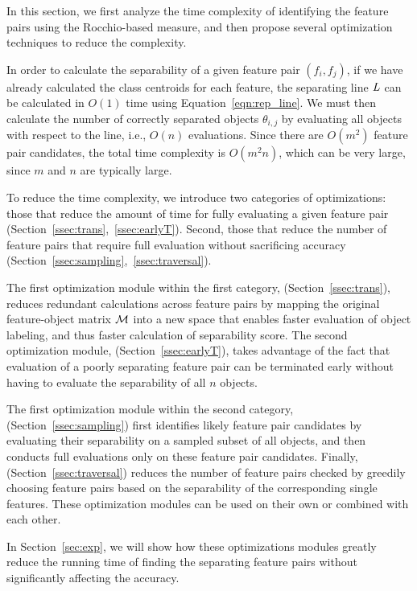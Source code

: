 In this section, we first analyze the time complexity of identifying the \topk feature pairs using the Rocchio-based measure, and then propose several optimization techniques to reduce the complexity.

 In order to calculate the separability of a given feature pair $(f_i, f_j)$, if we have already calculated the class centroids for each feature, the separating line $\mathit{L}$ can be calculated in $O(1)$ time using Equation~\ref{eqn:rep_line}. We must then calculate the number of correctly separated objects $\theta_{i,j}$ by evaluating all objects with respect to the line, i.e., $O(n)$ evaluations. Since there are $O(m^2)$ feature pair candidates, the total time complexity is $O(m^2n)$, which can be very large,
since $m$ and $n$ are typically large.

 To reduce the time complexity, we introduce two categories of optimizations:
those that reduce the amount of time  
for fully evaluating a given feature pair (Section~\ref{ssec:trans},~\ref{ssec:earlyT}). 
Second, those that reduce the number of feature pairs 
that require full evaluation without 
sacrificing accuracy (Section~\ref{ssec:sampling},~\ref{ssec:traversal}).

The first optimization module within the first category, \trans (Section~\ref{ssec:trans}), reduces redundant calculations across feature pairs by mapping the original feature-object matrix ${\mathcal{M}}$ into a new space that enables faster evaluation of object labeling, and thus faster calculation of separability score. The second optimization module, \earlyT (Section~\ref{ssec:earlyT}), takes advantage of the fact that evaluation of a poorly separating feature pair can be terminated early without having to evaluate the separability of all $n$ objects.

The first optimization module within the second category, \sampling 
(Section~\ref{ssec:sampling}) first identifies likely \topk feature pair candidates by evaluating their separability on a sampled subset of all objects, and then conducts full evaluations only on these feature pair candidates. 
Finally, \traversal (Section~\ref{ssec:traversal}) 
reduces the number of feature pairs checked by greedily 
choosing feature pairs based on the separability of the 
corresponding single features. These optimization modules can be used on their own or combined with each other.

In Section~\ref{sec:exp}, we will show how these optimizations modules greatly reduce the running time of finding the \topk separating feature pairs without significantly affecting the accuracy.

